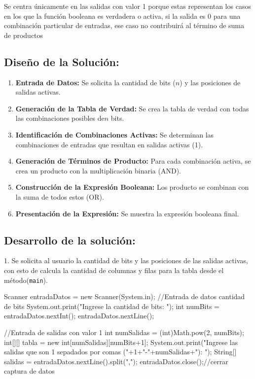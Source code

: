 Se centra únicamente en las salidas con valor 1 porque estas representan los casos en los que la función booleana es verdadera o activa, si la salida es 0 para una combinación particular de entradas, ese caso no contribuirá al término de suma de productos


\subsection{\textbf{Diseño de la Solución:}}

\begin{enumerate}
    \item \textbf{Entrada de Datos:}
        Se solicita la cantidad de bits (\(n\)) y las posiciones de salidas activas.
        
    \item \textbf{Generación de la Tabla de Verdad:}
        Se crea la tabla de verdad con todas las combinaciones posibles de\(n\) bits.

    \item \textbf{Identificación de Combinaciones Activas:}
        Se determinan las combinaciones de entradas que resultan en salidas activas (1).

    \item \textbf{Generación de Términos de Producto:}
        Para cada combinación activa, se crea un producto con la multiplicación binaria (AND).

    \item \textbf{Construcción de la Expresión Booleana:}
        Los producto se combinan con la suma de todos estos (OR).

    \item \textbf{Presentación de la Expresión:}
         Se muestra la expresión booleana final.        
\end{enumerate}
\newpage

\subsection{\textbf{Desarrollo de la solución:}}

1. Se solicita al usuario la cantidad de bits y las posiciones de las salidas activas, con esto de calcula la cantidad de columnas y filas para la tabla desde el método(\texttt{main}).
\begin{javaCode}
Scanner entradaDatos = new Scanner(System.in);
    //Entrada de datos cantidad de bits 
    System.out.print("Ingrese la cantidad de bits: ");
    int numBits = entradaDatos.nextInt();
    entradaDatos.nextLine();
    
    //Entrada de salidas con valor 1
    int numSalidas = (int)Math.pow(2, numBits);
    int[][] tabla = new int[numSalidas][numBits+1];
    System.out.print("Ingrese las salidas que son 1 sepadados por comas ("+1+"-"+numSalidas+"): ");
    String[] salidas = entradaDatos.nextLine().split(",");
    entradaDatos.close();//cerrar captura de datos
\end{javaCode}

